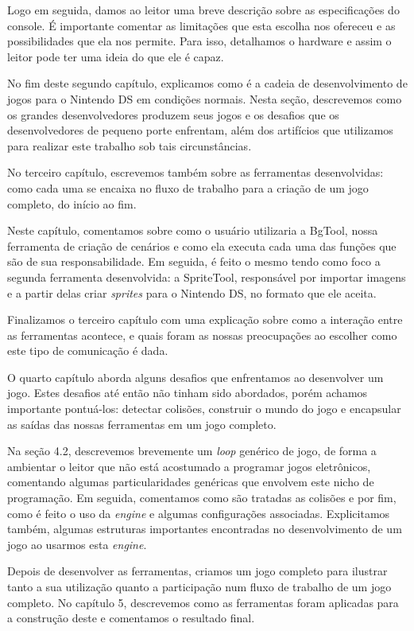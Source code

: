 \documentclass[brazil]{abnt}
\begin{document}
Logo em seguida, damos ao leitor uma breve descrição sobre as especificações do console. É importante comentar as limitações que esta escolha nos ofereceu e as possibilidades que ela nos permite. Para isso, detalhamos o hardware e assim o leitor pode ter uma ideia do que ele é capaz.

No fim deste segundo capítulo, explicamos como é a cadeia de desenvolvimento de jogos para o Nintendo DS em condições normais. Nesta seção, descrevemos como os grandes desenvolvedores produzem seus jogos e os desafios que os desenvolvedores de pequeno porte enfrentam, além dos artifícios que utilizamos para realizar este trabalho sob tais circunstâncias.

No terceiro capítulo, escrevemos também sobre as ferramentas desenvolvidas: como cada uma se encaixa no fluxo de trabalho para a criação de um jogo completo, do início ao fim.

Neste capítulo, comentamos sobre como o usuário utilizaria a BgTool, nossa ferramenta de criação de cenários e como ela executa cada uma das funções que são de sua responsabilidade. Em seguida, é feito o mesmo tendo como foco a segunda ferramenta desenvolvida: a SpriteTool, responsável por importar imagens e a partir delas criar \textit{sprites} para o Nintendo DS, no formato que ele aceita.

Finalizamos o terceiro capítulo com uma explicação sobre como a interação entre as ferramentas acontece, e quais foram as nossas preocupações ao escolher como este tipo de comunicação é dada.

O quarto capítulo aborda alguns desafios que enfrentamos ao desenvolver um jogo. Estes desafios até então não tinham sido abordados, porém achamos importante pontuá-los: detectar colisões, construir o mundo do jogo e encapsular as saídas das nossas ferramentas em um jogo completo.

Na seção 4.2, descrevemos brevemente um \textit{loop} genérico de jogo, de forma a ambientar o leitor que não está acostumado a programar jogos eletrônicos, comentando algumas particularidades genéricas que envolvem este nicho de programação. Em seguida, comentamos como são tratadas as colisões e por fim, como é feito o uso da \textit{engine} e algumas configurações associadas. Explicitamos também, algumas estruturas importantes encontradas no desenvolvimento de um jogo ao usarmos esta \textit{engine}.

Depois de desenvolver as ferramentas, criamos um jogo completo para ilustrar tanto a sua utilização quanto a participação num fluxo de trabalho de um jogo completo. No capítulo 5, descrevemos como as ferramentas foram aplicadas para a construção deste e comentamos o resultado final.
\end{document}
